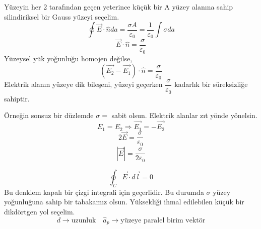 \begin{theorem}
\begin{figure}[H]
\begin{tikzpicture}[x=0.70pt,y=0.70pt,yscale=-0.75,xscale=0.75]
\end{tikzpicture}
\end{figure}

Yüzeyin her 2 tarafından geçen yeterince küçük bir A yüzey alanına sahip silindiriksel bir Gauss yüzeyi seçelim.
\[  \oint \Vec{E} \cdot \hat{n} da = \dfrac{\sigma A}{\varepsilon_{0}} = \dfrac{1}{\varepsilon_{0}} \int \sigma da \]
\[ \Vec{E} \cdot \hat{n} = \dfrac{\sigma}{\varepsilon_{0}} \]
Yüzeysel yük yoğunluğu homojen değilse,
\[\label{Denklem (1.22)} ( \Vec{E_{2}} - \Vec{E_{1}}) \cdot \hat{n} = \dfrac{\sigma}{\varepsilon_{0}} \tag{1.22} \]
Elektrik alanın yüzeye dik bileşeni, yüzeyi geçerken $\dfrac{\sigma}{\varepsilon_{0}}$ kadarlık bir süreksizliğe sahiptir.

\begin{example}
Örneğin sonsuz bir düzlemde $\sigma=$ sabit olsun. Elektrik alanlar zıt yönde yönelsin.
\[ E_{1} = E_{2} \Rightarrow \Vec{E_{1}} = - \Vec{E_{2}}\]
\[ 2 \Vec{E} = \dfrac{\sigma}{\varepsilon_{0}} \]
\[ |\Vec{E}| = \dfrac{\sigma}{2 \varepsilon_{0}} \]
\end{example}
\[ \oint_{C} \Vec{E} \cdot d\Vec{l} = 0 \]
Bu denklem kapalı bir çizgi integrali için geçerlidir. Bu durumda $\sigma$ yüzey yoğunluğuna sahip bir tabakamız olsun. Yüksekliği ihmal edilebilen küçük bir dikdörtgen yol seçelim.
\[ d \rightarrow \textrm{uzunluk} \quad \hat{a}_{p} \rightarrow \textrm{yüzeye paralel birim vektör} \]
\centering
\tikzset{
pattern size/.store in=\mcSize, 
pattern size = 5pt,
pattern thickness/.store in=\mcThickness, 
pattern thickness = 0.3pt,
pattern radius/.store in=\mcRadius, 
pattern radius = 1pt}
\makeatletter
{}
\makeatother
{} %
\begin{tikzpicture}[x=0.75pt,y=0.75pt,yscale=-1,xscale=1]


\end{tikzpicture}
\end{theorem}
